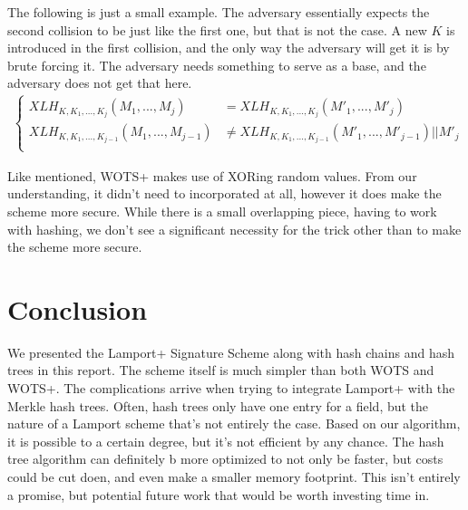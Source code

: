 \documentclass[]{scrartcl}
\begin{document}
The following is just a small example. The adversary essentially expects the second collision to be just like the first one, but that is not the case. A new $K$ is introduced in the first collision, and the only way the adversary will get it is by brute forcing it. The adversary needs something to serve as a base, and the adversary does not get that here.
\begin{equation}
\begin{split}
\begin{cases}
XLH_{K,K_1,...,K_j}(M_1,...,M_j) & =  XLH_{K,K_1,...,K_j}(M'_1,...,M'_j)\\
XLH_{K,K_1,...,K_{j-1}}(M_1,...,M_{j-1}) & \neq XLH_{K,K_1,...,K_{j-1}}(M'_1,...,M'_{j-1}) || M'_j\\
\end{cases}
\end{split}
\end{equation}

Like mentioned, WOTS+ makes use of XORing random values. From our understanding, it didn't need to incorporated at all, however it does make the scheme more secure. While there is a small overlapping piece, having to work with hashing, we don't see a significant necessity for the trick other than to make the scheme more secure.

\section*{Conclusion}
We presented the Lamport+ Signature Scheme along with hash chains and hash trees in this report. The scheme itself is much simpler than both WOTS and WOTS+. The complications arrive when trying to integrate Lamport+ with the Merkle hash trees. Often, hash trees only have one entry for a field, but the nature of a Lamport scheme that's not entirely the case. Based on our algorithm, it is possible to a certain degree, but it's not efficient by any chance. The hash tree algorithm can definitely b more optimized to not only be faster, but costs could be cut doen, and even make a smaller memory footprint. This isn't entirely a promise, but potential future work that would be worth investing time in.
\end{document}
